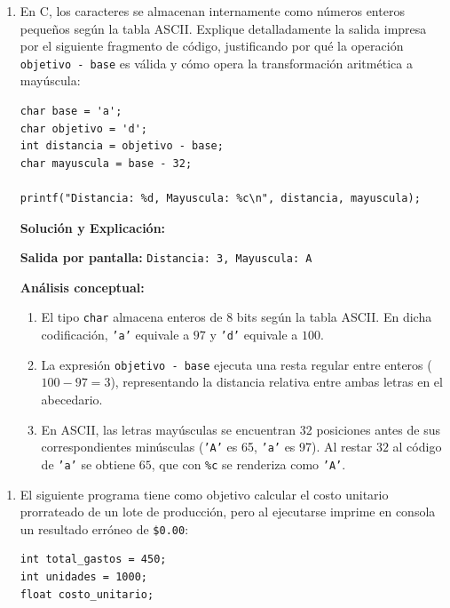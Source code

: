 \documentclass[11pt,letterpaper]{article}
\begin{document}
\begin{enumerate}[label=\textbf{\arabic*.}]
\begin{enumerate}[label=(\alph*)]
        \vspace{0.3cm}
        \item En C, los caracteres se almacenan internamente como números enteros pequeños según la tabla ASCII. Explique detalladamente la salida impresa por el siguiente fragmento de código, justificando por qué la operación \texttt{objetivo - base} es válida y cómo opera la transformación aritmética a mayúscula:
        \begin{lstlisting}[style=customc, numbers=none]
char base = 'a';
char objetivo = 'd';
int distancia = objetivo - base;
char mayuscula = base - 32;

printf("Distancia: %d, Mayuscula: %c\n", distancia, mayuscula);
        \end{lstlisting}

        \begin{solucionbox}
        \textbf{Solución y Explicación:}
        
        \noindent \textbf{Salida por pantalla:} \texttt{Distancia: 3, Mayuscula: A}
        
        \noindent \textbf{Análisis conceptual:}
        \begin{enumerate}[noitemsep]
            \item El tipo \texttt{char} almacena enteros de 8 bits según la tabla ASCII. En dicha codificación, \texttt{'a'} equivale a $97$ y \texttt{'d'} equivale a $100$.
            \item La expresión \texttt{objetivo - base} ejecuta una resta regular entre enteros ($100 - 97 = 3$), representando la distancia relativa entre ambas letras en el abecedario.
            \item En ASCII, las letras mayúsculas se encuentran 32 posiciones antes de sus correspondientes minúsculas (\texttt{'A'} es 65, \texttt{'a'} es 97). Al restar $32$ al código de \texttt{'a'} se obtiene $65$, que con \texttt{\%c} se renderiza como \texttt{'A'}.
        \end{enumerate}
        \end{solucionbox}
    \end{enumerate}

    \newpage
    \begin{enumerate}[label=(\alph*), resume]
        \item El siguiente programa tiene como objetivo calcular el costo unitario prorrateado de un lote de producción, pero al ejecutarse imprime en consola un resultado erróneo de \texttt{\$0.00}:
        \begin{lstlisting}[style=customc]
int total_gastos = 450;
int unidades = 1000;
float costo_unitario;


\end{lstlisting}
\end{enumerate}
\end{enumerate}
\end{document}
